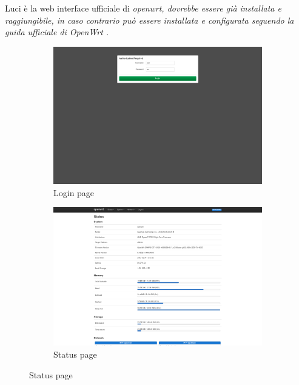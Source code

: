 Luci è la web interface ufficiale di \it{openwrt}, dovrebbe essere già installata e raggiungibile, in caso contrario può essere installata e configurata seguendo la guida ufficiale di \it{OpenWrt} \cite{install-luci}.

\begin{figure}[H]
    \centering

    \begin{subfigure}{0.5\textwidth}
        \centering
        \includegraphics[height=0.65\linewidth]{immagini/LuCI_login}
        \caption{Login page}
        \label{fig:luci-login}
    \end{subfigure}%
    \hfill
    \begin{subfigure}{0.5\textwidth}
        \centering
        \includegraphics[height=0.65\linewidth]{immagini/LuCI_status}
        \caption{Status page}
        \label{fig:luci-status}
    \end{subfigure}%


\end{figure}
